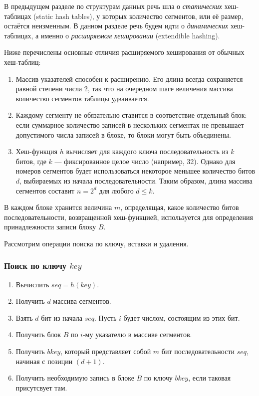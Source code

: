 В предыдущем разделе по структурам данных речь шла о \emph{статических} хеш-таблицах (static hash tables), у которых количество сегментов, или её размер, остаётся неизменным. В данном разделе речь будем идти о \emph{динамических} хеш-таблицах, а именно о \emph{расширяемом хешировании} (extendible hashing).

Ниже перечислены основные отличия расширяемого хеширования от обычных хеш-таблиц:
\begin{enumerate}
  \item Массив указателей способен к расширению. Его длина всегда сохраняется равной степени числа 2, так что на очередном шаге величения массива количество сегментов таблицы удваивается.
  \item Каждому сегменту не обязательно ставится в соответствие отдельный блок: если суммарное количество записей в нескольких сегментах не превышает допустимого числа записей в блоке, то блоки могут быть объединены.
  \item Хеш-функция $h$ вычисляет для каждого ключа последовательность из $k$ битов, где $k$ — фиксированное целое число (например, 32). Однако для номеров сегментов будет использоваться некоторое меньшее количество битов $d$, выбираемых из начала последовательности. Таким образом, длина массива сегментов составит $n = 2^d$ для любого $d \leq k$.
\end{enumerate}

В каждом блоке хранится величина $m$, определящая, какое количество битов последовательности, возвращенной хеш-функцией, используется для определения принадлежности записи блоку $B$.

Рассмотрим операции поиска по ключу, вставки и удаления.

\subsubsection{Поиск по ключу $key$}
\begin{enumerate}
  \item Вычислить $seq = h(key)$.
  \item Получить $d$ массива сегментов.
  \item Взять $d$ бит из начала $seq$. Пусть $i$ будет числом, состоящим из этих бит.
  \item Получить блок $B$ по $i$-му указателю в массиве сегментов.
  \item Получить $bkey$, который представляет собой $m$ бит последовательности $seq$, начиная с позиции $(d + 1)$.
  \item Получить необходимую запись в блоке $B$ по ключу $bkey$, если таковая присутсвует там.
\end{enumerate}

